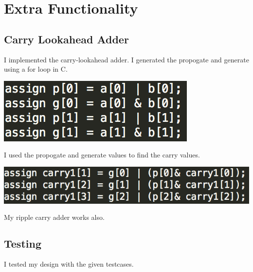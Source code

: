 \documentclass[11pt,a4paper,titlepage]{article}
\begin{document}
\section{Extra Functionality}{%
    \subsection{Carry Lookahead Adder}{
        I implemented the carry-lookahead adder. I generated the propogate and generate using a for loop in C. 
        \begin{center}
            \includegraphics[scale = 1]{propogate.png}
        \end{center}
        
        \center I used the propogate and generate values to find the carry values.
        \begin{center}
            \includegraphics[scale =1]{carry_look.png}
        \end{center}
        
        My ripple carry adder works also.
    }
    
    \subsection{Testing}{
        I tested my design with the given testcases.
    }\label{sub:sub2-1}
}
\end{document}
